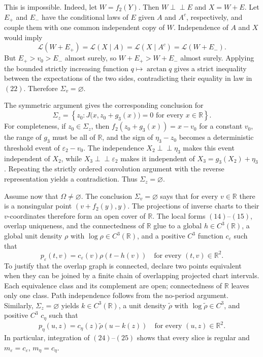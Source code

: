This is impossible.  Indeed, let \(W=f_2(Y)\).  Then \(W\perp\!\!\!\perp E\) and \(X=W+E\).  Let \(E_+\) and \(E_-\) have the conditional laws of \(E\) given \(A\) and \(A^c\), respectively, and couple them with one common independent copy of \(W\).  Independence of \(A\) and \(X\) would imply
\[
 \mathcal L(W+E_+)=\mathcal L(X\mid A)
 =\mathcal L(X\mid A^c)=\mathcal L(W+E_-).
\tag{22}
\]
But \(E_+>v_0>E_-\) almost surely, so \(W+E_+>W+E_-\) almost surely.  Applying the bounded strictly increasing function \(q\mapsto\arctan q\) gives a strict inequality between the expectations of the two sides, contradicting their equality in law in \((22)\).  Therefore \(\Sigma_v=\varnothing\).

The symmetric argument gives the corresponding conclusion for
\[
 \Sigma_z=\left\{z_0:J\bigl(x,z_0+g_3(x)\bigr)=0
 \text{ for every }x\in\mathbb R\right\}.
\tag{23}
\]
For completeness, if \(z_0\in\Sigma_z\), then
\(f_2(z_0+g_3(x))=x-v_0\) for a constant \(v_0\), the range of \(g_3\) must be all of \(\mathbb R\), and the sign of \(\eta_3-z_0\) becomes a deterministic threshold event of \(\varepsilon_2-v_0\).  The independence \(X_2\perp\!\!\!\perp\eta_3\) makes this event independent of \(X_2\), while \(X_3\perp\!\!\!\perp\varepsilon_2\) makes it independent of \(X_3=g_3(X_2)+\eta_3\).  Repeating the strictly ordered convolution argument with the reverse representation yields a contradiction.  Thus \(\Sigma_z=\varnothing\).

Assume now that \(\Omega\ne\varnothing\).  The conclusion \(\Sigma_v=\varnothing\) says that for every \(v\in\mathbb R\) there is a nonsingular point \((v+f_2(y),y)\).  The projections of inverse charts to their \(v\)-coordinates therefore form an open cover of \(\mathbb R\).  The local forms \((14)\)--\((15)\), overlap uniqueness, and the connectedness of \(\mathbb R\) glue to a global \(h\in C^3(\mathbb R)\), a global unit density \(\rho\) with \(\log\rho\in C^3(\mathbb R)\), and a positive \(C^3\) function \(c_\varepsilon\) such that
\[
 p_\varepsilon(t,v)=c_\varepsilon(v)\rho(t-h(v))
 \quad\text{for every }(t,v)\in\mathbb R^2.
\tag{24}
\]
To justify that the overlap graph is connected, declare two points equivalent when they can be joined by a finite chain of overlapping projected chart intervals.  Each equivalence class and its complement are open; connectedness of \(\mathbb R\) leaves only one class.  Path independence follows from the no-period argument.  Similarly, \(\Sigma_z=\varnothing\) yields \(k\in C^3(\mathbb R)\), a unit density \(\widetilde\rho\) with \(\log\widetilde\rho\in C^3\), and positive \(C^3\) \(c_\eta\) such that
\[
 p_\eta(u,z)=c_\eta(z)\widetilde\rho(u-k(z))
 \quad\text{for every }(u,z)\in\mathbb R^2.
\tag{25}
\]
In particular, integration of \((24)\)--\((25)\) shows that every slice is regular and
\(m_\varepsilon=c_\varepsilon\), \(m_\eta=c_\eta\).

